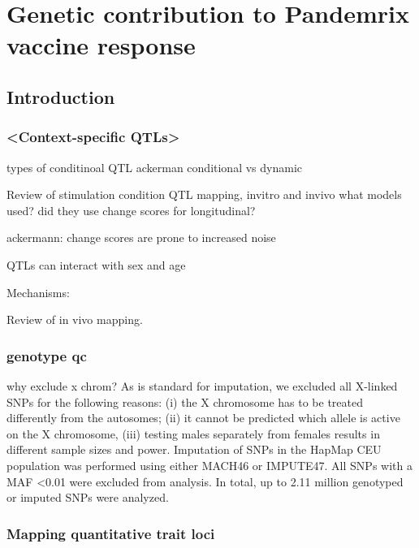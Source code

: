 %
%

\chapter{Genetic contribution to Pandemrix vaccine response}

\section{Introduction}

\subsection{<Context-specific QTLs>}

types of conditinoal QTL
    ackerman conditional vs dynamic

Review of stimulation condition QTL mapping, invitro and invivo
what models used? did they use change scores for longitudinal?

ackermann: change scores are prone to increased noise

QTLs can interact with sex and age

Mechanisms: 

Review of in vivo mapping.

\subsection{genotype qc}

why exclude x chrom?
As is standard for imputation, we excluded all X-linked SNPs for the following reasons: (i) the X chromosome has to be treated differently from the autosomes; (ii) it cannot be predicted which allele is active on the X chromosome, (iii) testing males separately from females results in different sample sizes and power. Imputation of SNPs in the HapMap CEU population was performed using either MACH46 or IMPUTE47. All SNPs with a MAF <0.01 were excluded from analysis. In total, up to 2.11 million genotyped or imputed SNPs were analyzed.

\subsection{Mapping quantitative trait loci}

